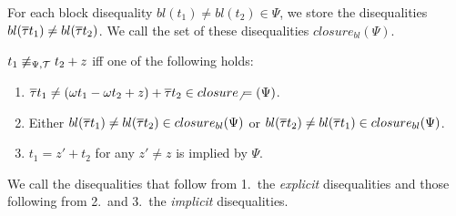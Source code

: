 For each block disequality $bl(t_1) \neq bl(t_2) \in \Psi$, we store the disequalities $bl(\overline{\tau} t_1) \neq bl(\overline{\tau} t_2)$.
We call the set of these disequalities $closure_{bl}(\Psi)$.

\begin{lemma}\label{lemma:diseq_types}
  $t_1 \not\equiv_{\Psi,\mathcal{T}} t_2 + z$ iff one of the following holds:

  \begin{enumerate}
    \item $\overline{\tau} t_1 \neq (\omega t_1 - \omega t_2 + z) + \overline{\tau} t_2 \in closure_\neq(\Psi)$.
    \item Either $bl(\overline{\tau} t_1) \neq bl(\overline{\tau} t_2) \in closure_{bl}(\Psi)$ or $bl(\overline{\tau} t_2) \neq bl(\overline{\tau} t_1) \in closure_{bl}(\Psi)$.
    \item $t_1 = z' + t_2$ for any $z' \neq z$ is implied by $\Psi$.
  \end{enumerate}
  We call the disequalities that follow from 1.\ the \emph{explicit} disequalities and those following from 2.\ and 3.\ the \emph{implicit} disequalities.
\end{lemma}
